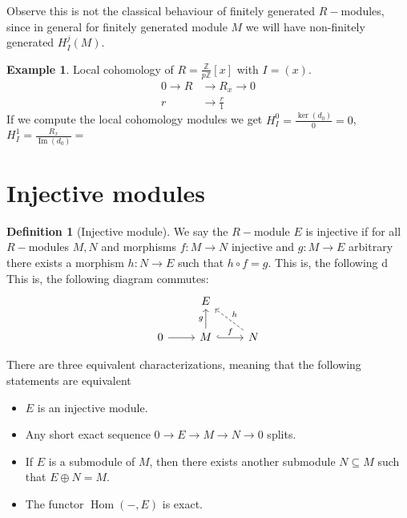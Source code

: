 \documentclass[leqno]{article}
\theoremstyle{definition}
\newtheorem{definition}{Definition}[section]
\newtheorem{example}{Example}[section]
\DeclareMathOperator{\Hom}{Hom}
\DeclareMathOperator{\im}{Im}
\begin{document}
Observe this is not the classical behaviour of finitely generated $R-$modules, since in general  for finitely generated module $M$ we will have non-finitely generated $H^j_I(M)$.

\begin{example} Local cohomology of $R = \frac{\mathbb{Z}}{p\mathbb{Z}}[x]$ with $I = (x)$.
  \begin{align*}
	0 \to R & \to R_x \to 0 \\
	r &\to \frac{r}{1}
  \end{align*}
If we compute the local cohomology modules we get $H^0_{I} = \frac{\ker(d_0)}{0} = 0$, $H^1_{I} = \frac{R_x}{\im(d_0)} = \frac{}{}$
\end{example}


\section{Injective modules}

\begin{definition}[Injective module] We say the $R-$module $E$ is injective if for all $R-$modules $M, N$ and morphisms $f:M\to N$ injective and $g:M\to E$ arbitrary there exists a morphism  $h:N\to E$ such that $h\circ f=g$. This is, the following d This is, the following diagram commutes:
\[\begin{tikzcd}
	& E \\
	0 & M & N
	\arrow[from=2-1, to=2-2]
	\arrow["g", from=2-2, to=1-2]
	\arrow["f", hook, from=2-2, to=2-3]
	\arrow["h"', dashed, from=2-3, to=1-2]
\end{tikzcd}\]
\end{definition}

There are three equivalent characterizations, meaning that the following statements are equivalent
\begin{itemize}[topsep=-6pt, itemsep=0pt]
  \item $E$ is an injective module.
  \item Any short exact sequence $0\to E \to M \to N \to 0$ splits.
  \item If $E$ is a submodule of $M$, then there exists another submodule $N\subseteq M$ such that $E \oplus N = M$.
  \item The functor  $\Hom(-,E)$ is exact.
\end{itemize}
\end{document}
